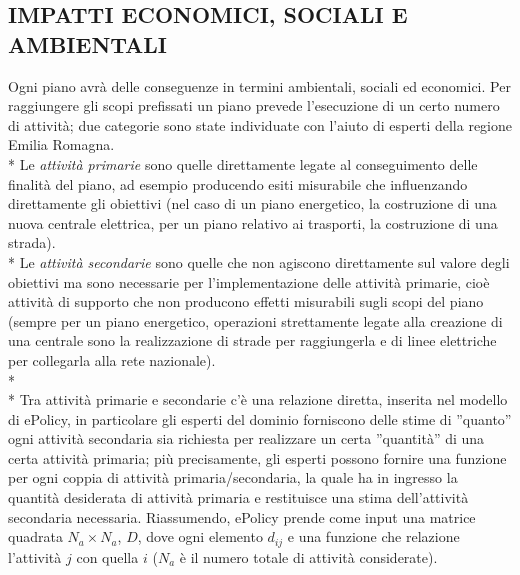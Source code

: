 \documentclass[12pt,a4paper,openright,twoside]{report}
\begin{document}
\subsection[IMPATTI]{\nohyphens{IMPATTI ECONOMICI, SOCIALI E AMBIENTALI}}
Ogni piano avrà delle conseguenze in termini ambientali, sociali ed economici. Per raggiungere gli scopi prefissati un piano prevede l'esecuzione di un certo numero di attività; due categorie sono state individuate con l'aiuto di esperti della regione Emilia Romagna.\\*
Le \emph{attività primarie} sono quelle direttamente legate al conseguimento delle finalità del piano, ad esempio producendo esiti misurabile che influenzando direttamente gli obiettivi (nel caso di un piano energetico, la costruzione di una nuova centrale elettrica, per un piano relativo ai trasporti, la costruzione di una strada).\\*
Le \emph{attività secondarie} sono quelle che non agiscono direttamente sul valore degli obiettivi ma sono necessarie per l'implementazione delle attività primarie, cioè attività di supporto che non producono effetti misurabili sugli scopi del piano (sempre per un piano energetico, operazioni strettamente legate alla creazione di una centrale sono la realizzazione di strade per raggiungerla e di linee elettriche per collegarla alla rete nazionale).\\*\\*
Tra attività primarie e secondarie c'è una relazione diretta, inserita nel modello di ePolicy, in particolare gli esperti del dominio forniscono delle stime di ''quanto'' ogni attività secondaria sia richiesta per realizzare un  certa ''quantità'' di una certa attività primaria; più precisamente, gli esperti possono fornire una funzione per ogni coppia di attività primaria/secondaria, la quale ha in ingresso la quantità desiderata di attività primaria e restituisce una stima dell'attività secondaria necessaria. Riassumendo, ePolicy prende come input una matrice quadrata $N_a \times N_a$, $D$, dove ogni elemento $d_{ij}$ e una funzione che relazione l'attività $j$ con quella $i$ ($N_a$ è il numero totale di attività considerate).
\end{document}
